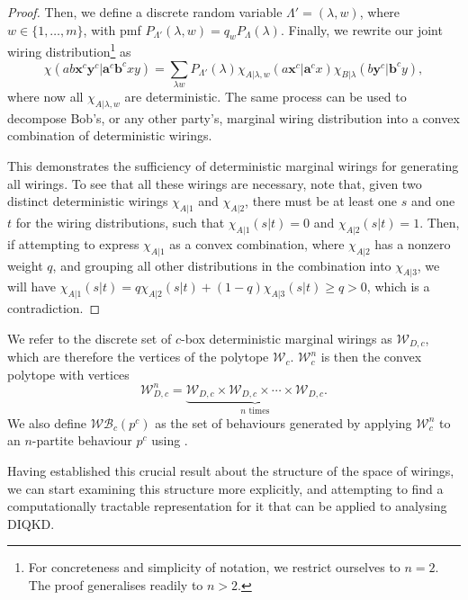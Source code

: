 \documentclass[10pt, a4paper]{article}
\numberwithin{equation}{section} %
\theoremstyle{definition}
\theoremstyle{plain}
\newcommand{\dintv}[2]{\mathopen\{#1,\ldots,#2\mathclose\}}
\newcommand{\?}{\mathrel{?}} %
\newcommand{\cvec}[1]{\boldsymbol{\mathbf{#1}}}    %
\newcommand{\sW}{\mathcal{W}}
\newcommand{\sWB}{\mathcal{WB}}
\begin{document}
\begin{proof}
                    Then, we define a discrete random variable \(\Lambda' = (\lambda, w)\), where \(w \in \dintv{1}{m}\), with pmf \(P_{\Lambda'}(\lambda, w) = q_w P_{\Lambda}(\lambda)\). Finally, we rewrite our joint wiring distribution\footnote{For concreteness and simplicity of notation, we restrict ourselves to \(n=2\). The proof generalises readily to \(n>2\).} as
                    \begin{equation}
                      \chi(ab\cvec{x}^c\cvec{y}^c|\cvec{a}^c\cvec{b}^cxy) = \sum_{\lambda w} P_{\Lambda'}(\lambda) \chi_{A|\lambda,w}(a\cvec{x}^c|\cvec{a}^cx) \chi_{B|\lambda}(b\cvec{y}^c|\cvec{b}^cy),
                    \end{equation}
                    where now all \(\chi_{A|\lambda,w}\) are deterministic. The same process can be used to decompose Bob's, or any other party's, marginal wiring distribution into a convex combination of deterministic wirings.

                    This demonstrates the sufficiency of deterministic marginal wirings for generating all wirings. To see that all these wirings are necessary, note that, given two distinct deterministic wirings \(\chi_{A|1}\) and \(\chi_{A|2}\), there must be at least one \(s\) and one \(t\) for the wiring distributions, such that \(\chi_{A|1}(s|t) = 0\) and \(\chi_{A|2}(s|t) = 1\). Then, if attempting to express \(\chi_{A|1}\) as a convex combination, where \(\chi_{A|2}\) has a nonzero weight \(q\), and grouping all other distributions in the combination into \(\chi_{A|3}\), we will have \(\chi_{A|1}(s|t) = q\chi_{A|2}(s|t) + (1-q)\chi_{A|3}(s|t) \geq q > 0\), which is a contradiction.
                  \end{proof}

                  We refer to the discrete set of \(c\)-box deterministic marginal wirings as \(\sW_{D,c}\), which are therefore the vertices of the polytope \(\sW_c\). \(\sW_c^n\) is then the convex polytope with vertices
                  \begin{equation}
                    \sW_{D,c}^n = \underbrace{\sW_{D,c} \times \sW_{D,c} \times \cdots \times \sW_{D,c}}_{n\text{ times}}.
                  \end{equation}
                  We also define \(\sWB_c(p^c)\) as the set of behaviours generated by applying \(\sW_c^n\) to an \(n\)-partite behaviour \(p^c\) using .

              Having established this crucial result about the structure of the space of wirings, we can start examining this structure more explicitly, and attempting to find a computationally tractable representation for it that can be applied to analysing DIQKD.
\end{document}
